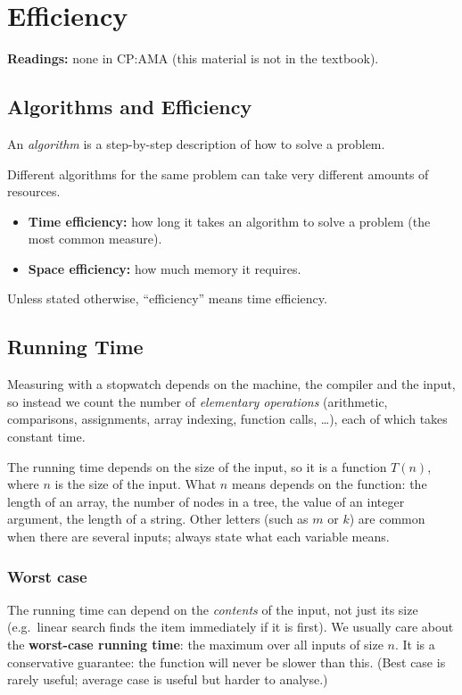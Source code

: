 \chapter{Efficiency}

\textbf{Readings:} none in CP:AMA (this material is not in the textbook).

\section{Algorithms and Efficiency}

\begin{definition}
An \emph{algorithm} is a step-by-step description of how to solve a problem.
\end{definition}

Different algorithms for the same problem can take very different amounts of resources.
\begin{itemize}
  \item \textbf{Time efficiency:} how long it takes an algorithm to solve a problem (the most
    common measure).
  \item \textbf{Space efficiency:} how much memory it requires.
\end{itemize}
Unless stated otherwise, ``efficiency'' means time efficiency.

\section{Running Time}

Measuring with a stopwatch depends on the machine, the compiler and the input, so instead we
count the number of \emph{elementary operations} (arithmetic, comparisons, assignments, array
indexing, function calls, \dots), each of which takes constant time.

The running time depends on the size of the input, so it is a function $T(n)$, where $n$ is the
size of the input. What $n$ means depends on the function: the length of an array, the number of
nodes in a tree, the value of an integer argument, the length of a string. Other letters (such
as $m$ or $k$) are common when there are several inputs; always state what each variable means.

\subsection{Worst case}

The running time can depend on the \emph{contents} of the input, not just its size (e.g.\ linear
search finds the item immediately if it is first). We usually care about the \textbf{worst-case
running time}: the maximum over all inputs of size $n$. It is a conservative guarantee: the
function will never be slower than this. (Best case is rarely useful; average case is useful but
harder to analyse.)

